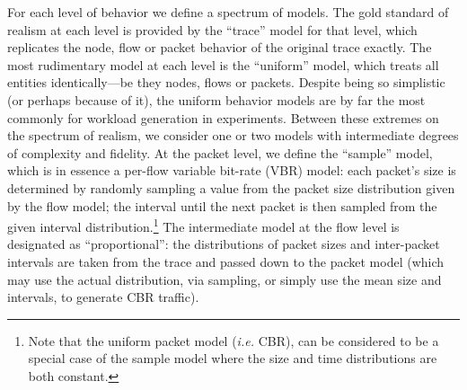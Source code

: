 \documentclass[conference]{IEEEtran}
\newcommand{\caps}[1]{{\small{#1}}}
\begin{document}


For each level of behavior we define a spectrum of models. The gold standard of realism at each level is provided by the ``trace'' model for that level, which replicates the node, flow or packet behavior of the original trace exactly. The most rudimentary model at each level is the ``uniform'' model, which treats all entities identically---be they nodes, flows or packets. Despite being so simplistic (or perhaps because of it), the uniform behavior models are by far the most commonly for workload generation in experiments. Between these extremes on the spectrum of realism, we consider one or two models with intermediate degrees of complexity and fidelity. At the packet level, we define the ``sample'' model, which is in essence a per-flow variable bit-rate (\caps{VBR}) model: each packet's size is determined by randomly sampling a value from the packet size distribution given by the flow model; the interval until the next packet is then sampled from the given interval distribution.\footnote{Note that the uniform packet model (\textit{i.e.} {\scriptsize{CBR}}), can be considered to be a special case of the sample model where the size and time distributions are both constant.} The intermediate model at the flow level is designated as ``proportional'': the distributions of packet sizes and inter-packet intervals are taken from the trace and passed down to the packet model (which may use the actual distribution, via sampling, or simply use the mean size and intervals, to generate \caps{CBR} traffic).
\end{document}
